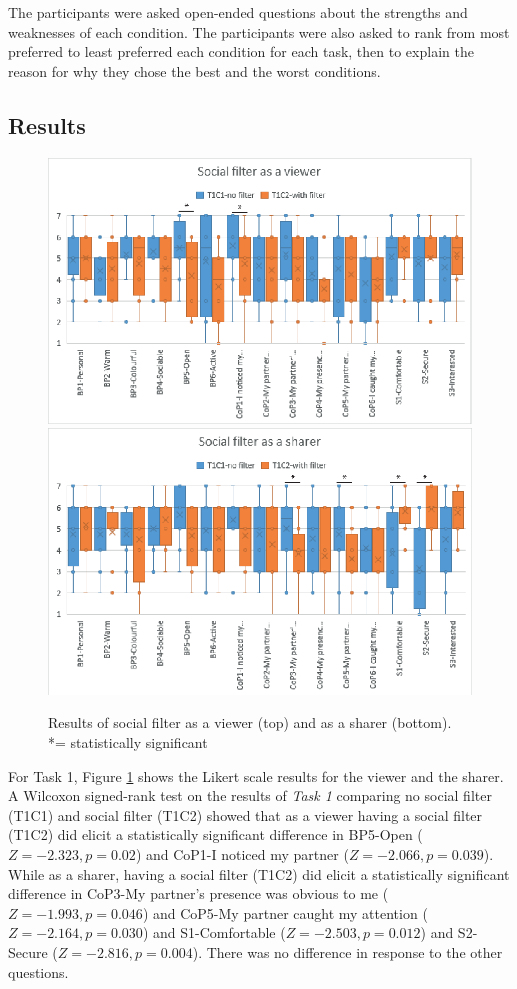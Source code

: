 The participants were asked open-ended questions about the strengths and weaknesses of each condition. The participants were also asked to rank from most preferred to least preferred each condition for each task, then to explain the reason for why they chose the best and the worst conditions. 


\subsection{Results}

\begin{figure}[H]
    \begin{center}
    \includegraphics[width=0.8\linewidth]{images/frontier18/images-03.eps}
    \includegraphics[width=0.8\linewidth]{images/frontier18/images-04.eps}
    \caption{Results of social filter as a viewer (top) and as a sharer (bottom). *= statistically significant}\label{fig:frontier18:result-filter}
    \end{center}
\end{figure}

For Task 1, Figure \ref{fig:frontier18:result-filter} shows the Likert scale results for the viewer and the sharer. A Wilcoxon signed-rank test on the results of \textit{Task 1} comparing no social filter (T1C1) and social filter (T1C2) showed that as a viewer having a social filter (T1C2) did elicit a statistically significant difference in BP5-Open ($Z=-2.323, p=0.02$) and CoP1-I noticed my partner ($Z=-2.066, p=0.039$). While as a sharer, having a social filter (T1C2) did elicit a statistically significant difference in CoP3-My partner's presence was obvious to me ($Z=-1.993, p=0.046$) and CoP5-My partner caught my attention ($Z=-2.164, p=0.030$) and S1-Comfortable ($Z=-2.503, p=0.012$) and S2-Secure ($Z=-2.816, p=0.004$). There was no difference in response to the other questions.

